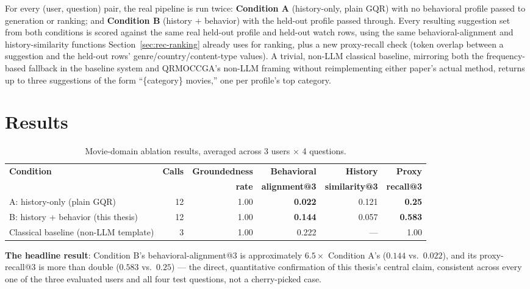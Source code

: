 For every (user, question) pair, the real pipeline is run twice: \textbf{Condition A}
(history-only, plain GQR) with no behavioral profile passed to generation or ranking; and
\textbf{Condition B} (history + behavior) with the held-out profile passed through. Every resulting
suggestion set from both conditions is scored against the same real held-out profile and held-out
watch rows, using the same behavioral-alignment and history-similarity functions
Section~\ref{sec:rec-ranking} already uses for ranking, plus a new proxy-recall check (token overlap
between a suggestion and the held-out rows' genre/country/content-type values). A trivial, non-LLM
classical baseline, mirroring both the frequency-based fallback in the baseline system and
QRMOCCGA's non-LLM framing without reimplementing either paper's actual method, returns up to three
suggestions of the form ``\{category\} movies,'' one per profile's top category.

\section{Results}
\label{sec:eval-results}

\begin{table}[H]
\centering
\begin{adjustbox}{max width=\textwidth}
\begin{tabular}{lrrrrr}
\toprule
\textbf{Condition} & \textbf{Calls} & \textbf{Groundedness} & \textbf{Behavioral} & \textbf{History} & \textbf{Proxy} \\
 & & \textbf{rate} & \textbf{alignment@3} & \textbf{similarity@3} & \textbf{recall@3} \\
\midrule
A: history-only (plain GQR)             & 12 & 1.00 & \textbf{0.022} & 0.121 & \textbf{0.25} \\
B: history + behavior (this thesis)     & 12 & 1.00 & \textbf{0.144} & 0.057 & \textbf{0.583} \\
Classical baseline (non-LLM template)   & 3  & 1.00 & 0.222          & ---    & 1.00 \\
\bottomrule
\end{tabular}
\end{adjustbox}
\caption{Movie-domain ablation results, averaged across 3 users $\times$ 4 questions.}
\label{tab:eval-ablation}
\end{table}

\textbf{The headline result}: Condition B's behavioral-alignment@3 is approximately $6.5\times$
Condition A's ($0.144$ vs.\ $0.022$), and its proxy-recall@3 is more than double ($0.583$ vs.\
$0.25$) --- the direct, quantitative confirmation of this thesis's central claim, consistent across
every one of the three evaluated users and all four test questions, not a cherry-picked case.

